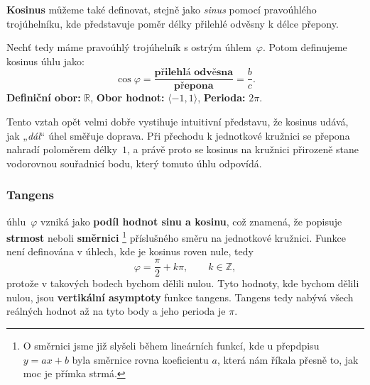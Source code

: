 \documentclass[12pt,a4paper]{article}
\begin{document}
\textbf{Kosinus} můžeme také definovat, stejně jako \emph{sinus} pomocí pravoúhlého trojúhelníku, 
kde představuje poměr délky přilehlé odvěsny k délce přepony.

\begin{definitionbox}
Nechť tedy máme pravoúhlý trojúhelník s ostrým úhlem~$\varphi$. Potom definujeme kosinus úhlu jako:
\[
\cos\varphi = 
\frac{\textbf{přilehlá odvěsna}}{\textbf{přepona}}
= \frac{b}{c}.
\]
\textbf{Definiční obor:} $\mathbb{R}$, \qquad
\textbf{Obor hodnot:} $\langle -1,1\rangle$, \qquad
\textbf{Perioda:} $2\pi$.
\end{definitionbox}

Tento vztah opět velmi dobře vystihuje intuitivní představu, že kosinus udává, jak „\emph{dál}“ úhel směřuje doprava.
Při přechodu k jednotkové kružnici se přepona nahradí poloměrem délky~$1$, a právě proto se kosinus na
kružnici přirozeně stane vodorovnou souřadnicí bodu, který tomuto úhlu odpovídá.

\begin{center}
\end{center}


\newpage



\subsubsection*{Tangens}

 úhlu~$\varphi$ vzniká jako \textbf{podíl hodnot sinu a kosinu},
což znamená, že popisuje \textbf{strmost} neboli \textbf{směrnici}
\footnote{O směrnici jsme již slyšeli během lineárních funkcí, kde u přepdpisu $y=ax+b$ byla směrnice rovna koeficientu $a$, která nám říkala přesně to, jak moc je přímka strmá.} 
příslušného směru na jednotkové 
kružnici. Funkce není definována v úhlech, kde je kosinus roven nule, tedy 
\[
\varphi = \frac{\pi}{2} + k\pi,\qquad k\in\mathbb{Z},
\]
protože v takových bodech bychom dělili nulou. Tyto hodnoty, kde bychom dělili nulou, jsou
\textbf{vertikální asymptoty} funkce tangens. Tangens tedy nabývá všech reálných hodnot až na tyto body
a jeho perioda je $\pi$.
\end{document}
